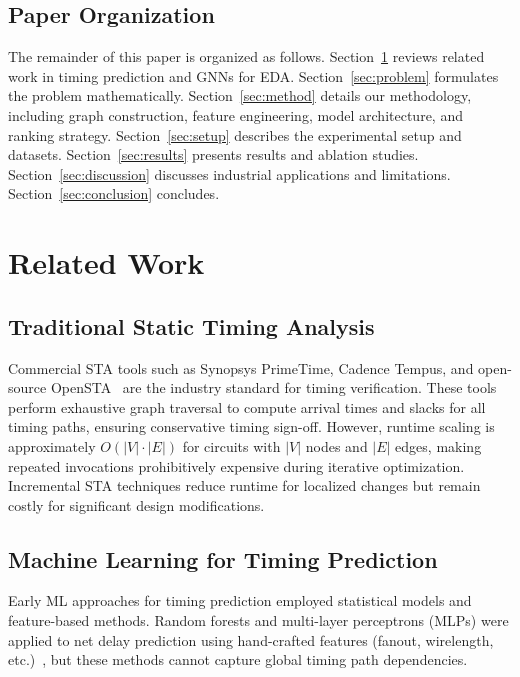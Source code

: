 \documentclass[10pt,twocolumn,journal]{IEEEtran}
\begin{document}
\subsection{Paper Organization}

The remainder of this paper is organized as follows. Section~\ref{sec:related} reviews related work in timing prediction and GNNs for EDA. Section~\ref{sec:problem} formulates the problem mathematically. Section~\ref{sec:method} details our methodology, including graph construction, feature engineering, model architecture, and ranking strategy. Section~\ref{sec:setup} describes the experimental setup and datasets. Section~\ref{sec:results} presents results and ablation studies. Section~\ref{sec:discussion} discusses industrial applications and limitations. Section~\ref{sec:conclusion} concludes.

\section{Related Work}
\label{sec:related}

\subsection{Traditional Static Timing Analysis}

Commercial STA tools such as Synopsys PrimeTime, Cadence Tempus, and open-source OpenSTA~\cite{opensta} are the industry standard for timing verification. These tools perform exhaustive graph traversal to compute arrival times and slacks for all timing paths, ensuring conservative timing sign-off. However, runtime scaling is approximately $O(|V| \cdot |E|)$ for circuits with $|V|$ nodes and $|E|$ edges, making repeated invocations prohibitively expensive during iterative optimization. Incremental STA techniques reduce runtime for localized changes but remain costly for significant design modifications.

\subsection{Machine Learning for Timing Prediction}

Early ML approaches for timing prediction employed statistical models and feature-based methods. Random forests and multi-layer perceptrons (MLPs) were applied to net delay prediction using hand-crafted features (fanout, wirelength, etc.)~\cite{kirby2019congestionnet}, but these methods cannot capture global timing path dependencies.
\end{document}
